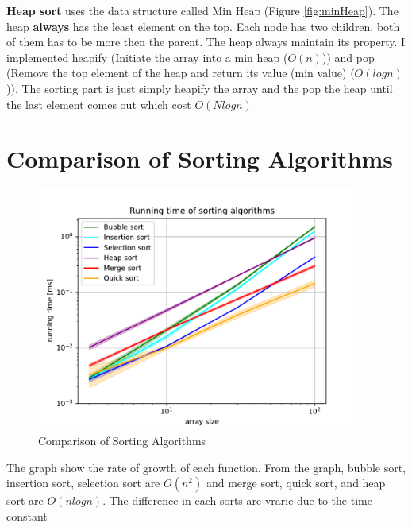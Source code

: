 \documentclass[12pt]{article}
\begin{document}
	\textbf{Heap sort} uses the data structure called Min Heap (Figure \ref{fig:minHeap}). The heap \textbf{always} has the least element on the top. Each node has two children, both of them has to be more then the parent. The heap always maintain its property. I implemented heapify (Initiate the array into a min heap ($O(n)$)) and pop (Remove the top element of the heap and return its value (min value) ($O(logn)$)). The sorting part is just simply heapify the array and the pop the heap until the last element comes out which cost $O(Nlogn)$
	
\newpage
\section{Comparison of Sorting Algorithms}

	\begin{figure}[ht]
		\centering
		\includegraphics[height=8cm]{sort_comparison.pdf}
		\caption{Comparison of Sorting Algorithms}
		\label{fig:sortComp}
	\end{figure}
	
	The graph show the rate of growth of each function. From the graph,  bubble sort, insertion sort, selection sort are $O(n^2)$ and merge sort, quick sort, and heap sort are $O(nlogn)$. The difference in each sorts are vrarie due to the time constant 
	
\end{document}
